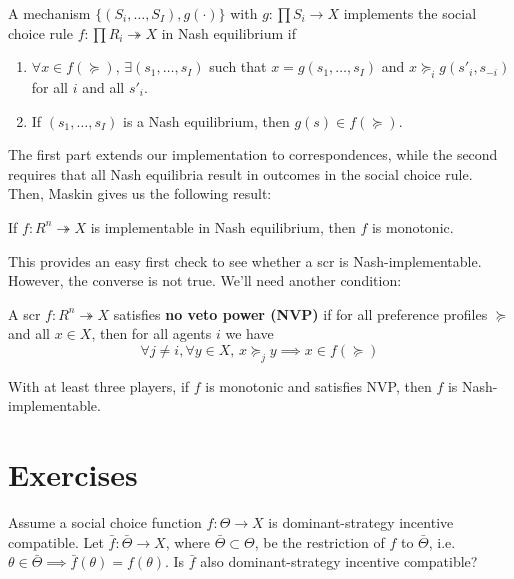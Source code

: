 \documentclass[10pt]{article}
\begin{document}
\begin{spacing}{1.0}
\begin{definition}
  A mechanism $\{(S_i, \ldots, S_I), g(\cdot)\}$ with
  $g:\prod S_i \to X$ implements the social choice
  rule $f: \prod R_i \twoheadrightarrow X$ in Nash
  equilibrium if
  \begin{enumerate}
  \item $\forall x \in f(\succeq), \, \exists (s_1, \ldots,
    s_I)$ such that $x = g(s_1, \ldots, s_I)$ and $x \succeq_i g(s'_i, s_{-i})$ for all $i$ and all $s'_i$.
  \item If $(s_1, \ldots, s_I)$ is a Nash equilibrium,
    then $g(s) \in f(\succeq)$.
  \end{enumerate}
\end{definition}

The first part extends our implementation to
correspondences, while the second requires that all Nash
equilibria result in outcomes in the social choice
rule. Then, Maskin gives us the following result:

\begin{theorem}
  If $f: R^n \twoheadrightarrow X$ is implementable in
  Nash equilibrium, then $f$ is monotonic.
\end{theorem}

This provides an easy first check to see whether a scr is
Nash-implementable. However, the converse is not
true. We'll need another condition:

\begin{definition}
  A scr $f: R^n \twoheadrightarrow X$ satisfies
  \textbf{no veto power (NVP)} if for all preference
  profiles $\succeq$ and all $x\in X$, then for all agents
  $i$ we have \[\forall j \neq i, \forall y\in X, \, x \succeq_j
  y \implies x\in f(\succeq)\]
\end{definition}

\begin{theorem}
  With at least three players, if $f$ is monotonic and
  satisfies NVP, then $f$ is Nash-implementable.
\end{theorem}

\newpage
\section{Exercises}
\label{sec:exercises}

\begin{exercise}
  Assume a social choice function $f: \Theta \to X$ is
  dominant-strategy incentive compatible. Let $\bar{f}: \bar{\Theta} \to
  X$, where $\bar{\Theta} \subset \Theta$, be the restriction of $f$ to
  $\bar{\Theta}$, i.e. $\theta \in \bar{\Theta} \implies \bar{f}(\theta) =
  f(\theta)$. Is $\bar{f}$ also dominant-strategy incentive compatible?
\end{exercise}


\end{spacing}
\end{document}
